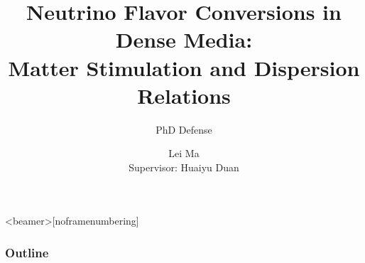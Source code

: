 \documentclass[9pt]{beamer}
\title{Neutrino Flavor Conversions in Dense Media:\\ Matter Stimulation and Dispersion Relations} %
\author{Lei Ma\\ Supervisor: Huaiyu Duan}
\subtitle{PhD Defense} %
\begin{document}
  \frame{\maketitle}


  \begin{darkframes}


      \begin{frame}<beamer>[noframenumbering]
        \frametitle{Outline}
        \tableofcontents
      \end{frame}


























  \end{darkframes}



\appendix


\end{document}
